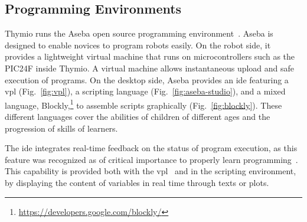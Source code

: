 \documentclass[letterpaper, 10 pt, conference]{ieeeconf}  %
\begin{document}
\subsection{Programming Environments}
\label{sec:aseba}

Thymio runs the Aseba open source programming environment~\cite{aseba}.
Aseba is designed to enable novices to program robots easily.
On the robot side, it provides a lightweight virtual machine that runs on microcontrollers such as the PIC24F inside Thymio.
A virtual machine allows instantaneous upload and safe execution of programs.
On the desktop side, Aseba provides an \ac{ide} featuring a \ac{vpl} (Fig.~\ref{fig:vpl}), a scripting language (Fig.~\ref{fig:aseba-studio}), and a mixed language, Blockly,\footnote{\url{https://developers.google.com/blockly/}} to assemble scripts graphically (Fig.~\ref{fig:blockly}).
These different languages cover the abilities of children of different ages and the progression of skills of learners.


The \ac{ide} integrates real-time feedback on the status of program execution, as this feature was recognized as of critical importance to properly learn programming~\cite{sorva2013notional}.
This capability is provided both with the \ac{vpl}~\cite{Magnenat2015} and in the scripting environment, by displaying the content of variables in real time through texts or plots.
\end{document}

